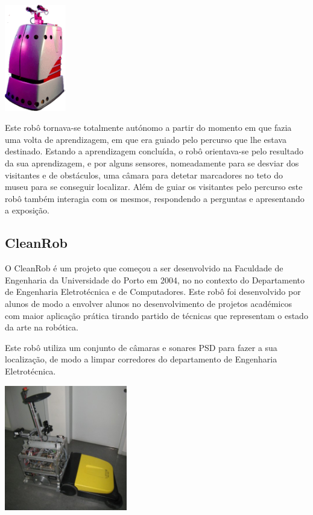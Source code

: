 \begin{center}
	\includegraphics[width=0.20\textwidth]{./figures/minerva.png}
	\label{fig:4}
\end{center}

Este robô tornava-se totalmente autónomo a partir do momento em que fazia uma volta de aprendizagem, em que era guiado pelo percurso que lhe estava destinado. Estando a aprendizagem concluída, o robô orientava-se pelo resultado da sua aprendizagem, e por alguns sensores, nomeadamente para se desviar dos visitantes e de obstáculos, uma câmara para detetar marcadores no teto do museu para se conseguir localizar.
Além de guiar os visitantes pelo percurso este robô também interagia com os mesmos, respondendo a perguntas e apresentando a exposição.

\subsection{CleanRob}

O CleanRob é um projeto que começou a ser desenvolvido na Faculdade de Engenharia da Universidade do Porto em 2004, no no contexto do Departamento de Engenharia Eletrotécnica e de Computadores. Este robô foi desenvolvido por alunos de modo a envolver alunos no desenvolvimento de projetos académicos com maior aplicação prática tirando partido de técnicas que representam o estado da arte na robótica.

Este robô utiliza um conjunto de câmaras e sonares PSD para fazer a sua localização, de modo a limpar corredores do departamento de Engenharia Eletrotécnica.

\begin{center}
	\includegraphics[width=0.40\textwidth]{./figures/clean_rob.jpg}
	\label{fig:6}
\end{center}


